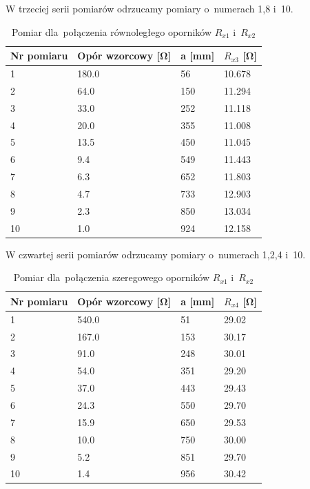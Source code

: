 \documentclass{fizraport}
\begin{document}
%
\begin{table}[!tbh]
\small
W trzeciej serii pomiarów odrzucamy pomiary o~numerach 1,8 i~10.
\caption{Pomiar dla~połączenia równoległego oporników $R_{x1}$ i~$R_{x2}$}
\centering
\begin{tabular}{|l|l|l|l|}
\hline
Nr pomiaru&Opór wzorcowy [\si{\ohm}] & a [\si{\milli\metre}] & $R_{x3}$ [\si{\ohm}]           \\ \hline
1&180.0                & 56     & 10.678   \\ \hline
2&64.0                 & 150    & 11.294   \\ \hline
3&33.0                 & 252    & 11.118   \\ \hline
4&20.0                 & 355    & 11.008   \\ \hline
5&13.5               & 450    & 11.045   \\ \hline
6&9.4                & 549    & 11.443   \\ \hline
7&6.3                & 652    & 11.803   \\ \hline
8&4.7                & 733    & 12.903   \\ \hline
9&2.3                & 850    & 13.034   \\ \hline
10&1.0                 & 924    & 12.158   \\ \hline
\end{tabular}
%
\end{table}
\begin{table}[!tbh]
\small
W czwartej serii pomiarów odrzucamy pomiary o~numerach 1,2,4 i~10.
\caption{Pomiar dla~połączenia szeregowego oporników $R_{x1}$ i~$R_{x2}$}
\centering
\begin{tabular}{|l|l|l|l|}
\hline
Nr pomiaru&Opór wzorcowy [\si{\ohm}] & a [\si{\milli\metre}] & $R_{x4}$ [\si{\ohm}]           \\ \hline
1&540.0                & 51     & 29.02   \\ \hline
2&167.0                & 153    & 30.17   \\ \hline
3&91.0                 & 248    & 30.01   \\ \hline
4&54.0                 & 351    & 29.20   \\ \hline
5&37.0                 & 443    & 29.43   \\ \hline
6&24.3               & 550    & 29.70   \\ \hline
7&15.9               & 650    & 29.53   \\ \hline
8&10.0                 & 750    & 30.00   \\ \hline
9&5.2                & 851    & 29.70   \\ \hline
10&1.4               & 956    & 30.42   \\ \hline
\end{tabular}
\end{table}
\newpage
\end{document}
